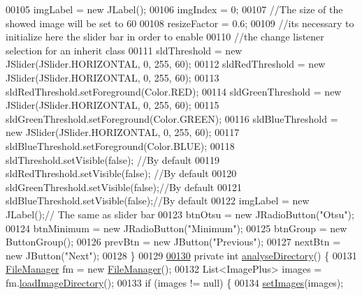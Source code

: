 \begin{DoxyCode}
00105     imgLabel = \textcolor{keyword}{new} JLabel();
00106     imgIndex = 0;
00107     \textcolor{comment}{//The size of the showed image will be set to 60%
00108     resizeFactor = 0.6; 
00109     \textcolor{comment}{//its necessary to initialize here the slider bar in order to enable }
00110     \textcolor{comment}{//the change listener selection for an inherit class}
00111     sldThreshold = \textcolor{keyword}{new} JSlider(JSlider.HORIZONTAL, 0, 255, 60); 
00112     sldRedThreshold = \textcolor{keyword}{new} JSlider(JSlider.HORIZONTAL, 0, 255, 60); 
00113     sldRedThreshold.setForeground(Color.RED);
00114     sldGreenThreshold = \textcolor{keyword}{new} JSlider(JSlider.HORIZONTAL, 0, 255, 60); 
00115     sldGreenThreshold.setForeground(Color.GREEN);
00116     sldBlueThreshold = \textcolor{keyword}{new} JSlider(JSlider.HORIZONTAL, 0, 255, 60);
00117     sldBlueThreshold.setForeground(Color.BLUE);
00118     sldThreshold.setVisible(\textcolor{keyword}{false}); \textcolor{comment}{//By default}
00119     sldRedThreshold.setVisible(\textcolor{keyword}{false}); \textcolor{comment}{//By default}
00120     sldGreenThreshold.setVisible(\textcolor{keyword}{false});\textcolor{comment}{//By default}
00121     sldBlueThreshold.setVisible(\textcolor{keyword}{false});\textcolor{comment}{//By default}
00122     imgLabel = \textcolor{keyword}{new} JLabel();\textcolor{comment}{// The same as slider bar}
00123     btnOtsu = \textcolor{keyword}{new} JRadioButton(\textcolor{stringliteral}{"Otsu"});
00124     btnMinimum = \textcolor{keyword}{new} JRadioButton(\textcolor{stringliteral}{"Minimum"});
00125     btnGroup = \textcolor{keyword}{new} ButtonGroup();
00126     prevBtn = \textcolor{keyword}{new} JButton(\textcolor{stringliteral}{"Previous"});
00127     nextBtn = \textcolor{keyword}{new} JButton(\textcolor{stringliteral}{"Next"});
00128   \}
00129 
\hypertarget{_image_analysis_window_8java_source_l00130}{}\hyperlink{classgui_1_1_image_analysis_window_ac7ee842ae75372575a568d7026989b23}{00130}   \textcolor{keyword}{private} \textcolor{keywordtype}{int} \hyperlink{classgui_1_1_image_analysis_window_ac7ee842ae75372575a568d7026989b23}{analyseDirectory}() \{
00131     \hyperlink{classfunctions_1_1_file_manager}{FileManager} fm = \textcolor{keyword}{new} \hyperlink{classfunctions_1_1_file_manager}{FileManager}();
00132     List<ImagePlus> images = fm.\hyperlink{classfunctions_1_1_file_manager_a0f8b52da290ba020437d01d4873b1d2c}{loadImageDirectory}();
00133     \textcolor{keywordflow}{if} (images != null) \{
00134       \hyperlink{classgui_1_1_image_analysis_window_a68997c66ca7a19a6676411bba4640aef}{setImages}(images);
}
\end{DoxyCode}
